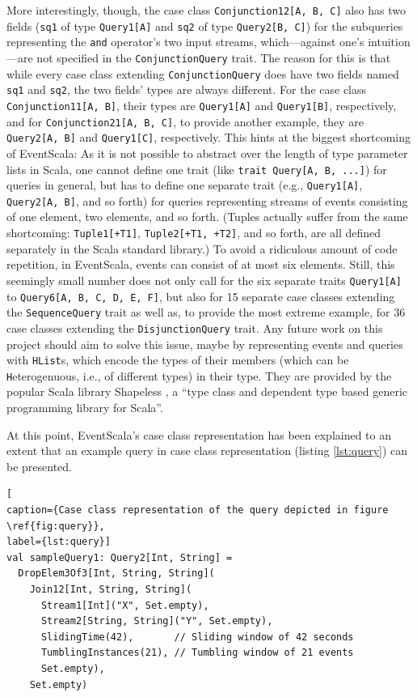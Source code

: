 \documentclass[article, 10pt, type=bsc, colorback, accentcolor=tud8b, parskip=half, bibliography=totocnumbered]{tudthesis}
\begin{document}
More interestingly, though, the case class \lstinline{Conjunction12[A, B, C]} also has two fields (\lstinline{sq1} of type \lstinline{Query1[A]} and \lstinline{sq2} of type \lstinline{Query2[B, C]}) for the subqueries representing the \lstinline{and} operator's two input streams, which---against one's intuition---are not specified in the \lstinline{ConjunctionQuery} trait.
The reason for this is that while every case class extending \lstinline{ConjunctionQuery} does have two fields named \lstinline{sq1} and \lstinline{sq2}, the two fields' types are always different.
For the case class \lstinline{Conjunction11[A, B]}, their types are \lstinline{Query1[A]} and \lstinline{Query1[B]}, respectively, and for \lstinline{Conjunction21[A, B, C]}, to provide another example, they are \lstinline{Query2[A, B]} and \lstinline{Query1[C]}, respectively.
This hints at the biggest shortcoming of EventScala:
As it is not possible to abstract over the length of type parameter lists in Scala, one cannot define one trait (like \lstinline{trait Query[A, B, ...]}) for queries in general, but has to define one separate trait (e.g., \lstinline{Query1[A]}, \lstinline{Query2[A, B]}, and so forth) for queries representing streams of events consisting of one element, two elements, and so forth.
(Tuples actually suffer from the same shortcoming: \lstinline{Tuple1[+T1]}, \lstinline{Tuple2[+T1, +T2]}, and so forth, are all defined separately in the Scala standard library.)
To avoid a ridiculous amount of code repetition, in EventScala, events can consist of at most six elements.
Still, this seemingly small number does not only call for the six separate traits \lstinline{Query1[A]} to \lstinline{Query6[A, B, C, D, E, F]}, but also for 15 separate case classes extending the \lstinline{SequenceQuery} trait as well as, to provide the most extreme example, for 36 case classes extending the \lstinline{DisjunctionQuery} trait.
Any future work on this project should aim to solve this issue, maybe by representing events and queries with \lstinline{HList}s, which encode the types of their members (which can be \lstinline{H}eterogenuous, i.e., of different types) in their type. They are provided by the popular Scala library Shapeless \cite{shapeless}, a ``type class and dependent type based generic programming library for Scala''.

At this point, EventScala's case class representation has been explained to an extent that an example query in case class representation (listing \ref{lst:query}) can be presented.

\begin{lstlisting}[
caption={Case class representation of the query depicted in figure \ref{fig:query}},
label={lst:query}]
val sampleQuery1: Query2[Int, String] =
  DropElem3Of3[Int, String, String](
    Join12[Int, String, String](
      Stream1[Int]("X", Set.empty),
      Stream2[String, String]("Y", Set.empty),
      SlidingTime(42),       // Sliding window of 42 seconds
      TumblingInstances(21), // Tumbling window of 21 events
      Set.empty),
    Set.empty)
\end{lstlisting}
\end{document}
